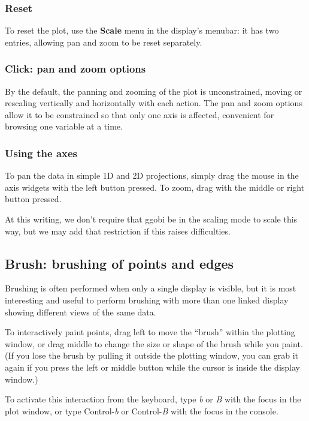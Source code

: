 \documentclass[11pt]{article}
\def\Widget#1{\textbf{#1}}
\begin{document}
\subsubsection{Reset}

To reset the plot, use the \Widget{Scale} menu in the display's menubar:
it has two entries, allowing pan and zoom to be reset separately.

\subsubsection{Click: pan and zoom options}

By the default, the panning and zooming of the plot is unconstrained,
moving or rescaling vertically and horizontally with each action.
The pan and zoom options allow it to be constrained so that only
one axis is affected, convenient for browsing one variable at a time.

\subsubsection{Using the axes}

To pan the data in simple 1D and 2D projections, simply drag the mouse
in the axis widgets with the left button pressed.  To zoom, drag with
the middle or right button pressed.

At this writing, we don't require that ggobi be in the scaling mode to
scale this way, but we may add that restriction if this raises
difficulties.

\subsection{Brush: brushing of points and edges}
\label{slbl:Brush}

Brushing is often performed when only a single display is visible,
but it is most interesting and useful to perform brushing with more
than one linked display showing different views of the same data.  

To interactively paint points, drag left to move the ``brush'' within
the plotting window, or drag middle to change the size or shape of
the brush while you paint.  (If you lose the brush by pulling it
outside the plotting window, you can grab it again if you press the
left or middle button while the cursor is inside the display window.)

To activate this interaction from the keyboard, type {\em b} or
{\em B} with the focus in the plot window, or type Control-{\em b} or
Control-{\em B} with the focus in the console.
\end{document}
